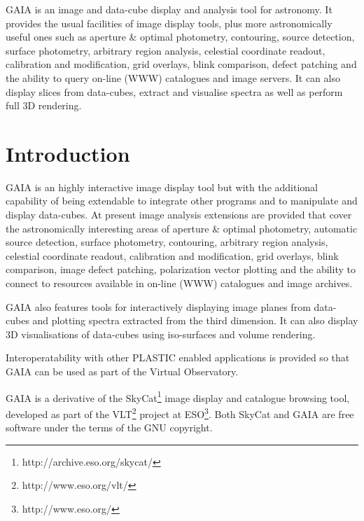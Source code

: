 \documentclass[twoside,11pt]{article}
\newcommand{\stardocinitials}  {SUN}
\newcommand{\stardocnumber}    {214.35}
\newcommand{\stardocabstract} {GAIA is an image and data-cube display 
and analysis tool for astronomy. It provides the usual facilities of image
display tools, plus more astronomically useful ones such as aperture \&
optimal photometry, contouring, source detection, surface photometry,
arbitrary region analysis, celestial coordinate readout, calibration
and modification, grid overlays, blink comparison, defect patching and
the ability to query on-line (WWW) catalogues and image servers. It can 
also display slices from data-cubes, extract and visualise spectra as 
well as perform full 3D rendering.}
\newcommand{\stardocname}{\stardocinitials /\stardocnumber}
\newcommand{\htmladdnormallinkfoot}[2]{#1\footnote{#2}}
\newenvironment{latexonly}{}{}
\newcommand{\xlabel}[1]{}
\renewcommand{\_}{\texttt{\symbol{95}}}
\renewcommand{\thepage}{\roman{page}}
\begin{document}
\stardocabstract
  \newpage
  \begin{latexonly}
    \setlength{\parskip}{0mm}
    \tableofcontents
    \setlength{\parskip}{\medskipamount}
    \markboth{\stardocname}{\stardocname}
  \end{latexonly}
\cleardoublepage
\renewcommand{\thepage}{\arabic{page}}
\setcounter{page}{1}


\section{Introduction\xlabel{introduction}\label{introduction}}

GAIA is an highly interactive image display tool but with the additional
capability of being extendable to integrate other programs and to manipulate
and display data-cubes.  At present image analysis extensions are provided
that cover the astronomically interesting areas of aperture \& optimal
photometry, automatic source detection, surface photometry, contouring,
arbitrary region analysis, celestial coordinate readout, calibration and
modification, grid overlays, blink comparison, image defect patching,
polarization vector plotting and the ability to connect to resources available
in on-line (WWW) catalogues and image archives.

GAIA also features tools for interactively displaying image planes from
data-cubes and plotting spectra extracted from the third dimension. It can
also display 3D visualisations of data-cubes using iso-surfaces and volume
rendering.

Interoperatability with other PLASTIC enabled applications is provided so that
GAIA can be used as part of the Virtual Observatory.

GAIA is a derivative of the
\htmladdnormallinkfoot{SkyCat}{http://archive.eso.org/skycat/} image
display and catalogue browsing tool, developed as part of the
\htmladdnormallinkfoot{VLT}{http://www.eso.org/vlt/} project at
\htmladdnormallinkfoot{ESO}{http://www.eso.org/}. Both SkyCat and GAIA are
free software under the terms of the GNU copyright.
\end{document}
